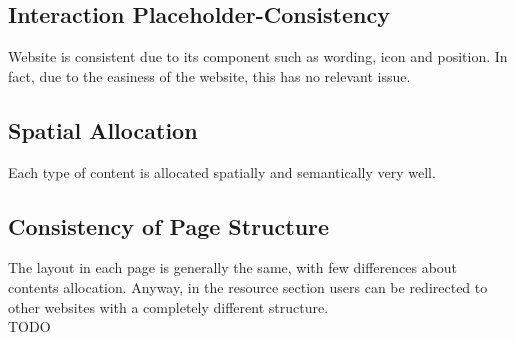 \subsection{Interaction Placeholder-Consistency}
Website is consistent due to its component such as wording, icon and position. In fact, due to the easiness of the website, this has no relevant issue.

\subsection{Spatial Allocation}
Each type of content is allocated spatially and semantically very well. 

\subsection{Consistency of Page Structure}
The layout in each page is generally the same, with few differences about contents allocation. Anyway, in the resource section users can be redirected to other websites with a completely different structure.\\
TODO
